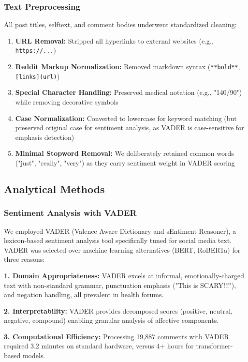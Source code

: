 \documentclass[12pt, a4paper]{article}
\begin{document}
\subsubsection{Text Preprocessing}
All post titles, selftext, and comment bodies underwent standardized cleaning:
\begin{enumerate}
    \item \textbf{URL Removal:} Stripped all hyperlinks to external websites (e.g., \texttt{https://...})
    \item \textbf{Reddit Markup Normalization:} Removed markdown syntax (\texttt{**bold**}, \texttt{[links](url)})
    \item \textbf{Special Character Handling:} Preserved medical notation (e.g., "140/90") while removing decorative symbols
    \item \textbf{Case Normalization:} Converted to lowercase for keyword matching (but preserved original case for sentiment analysis, as VADER is case-sensitive for emphasis detection)
    \item \textbf{Minimal Stopword Removal:} We deliberately retained common words ("just", "really", "very") as they carry sentiment weight in VADER scoring
\end{enumerate}

\subsection{Analytical Methods}

\subsubsection{Sentiment Analysis with VADER}
We employed VADER (Valence Aware Dictionary and sEntiment Reasoner), a lexicon-based sentiment analysis tool specifically tuned for social media text. VADER was selected over machine learning alternatives (BERT, RoBERTa) for three reasons:

\textbf{1. Domain Appropriateness:} VADER excels at informal, emotionally-charged text with non-standard grammar, punctuation emphasis ("This is SCARY!!!"), and negation handling, all prevalent in health forums.

\textbf{2. Interpretability:} VADER provides decomposed scores (positive, neutral, negative, compound) enabling granular analysis of affective components.

\textbf{3. Computational Efficiency:} Processing 19,887 comments with VADER required 3.2 minutes on standard hardware, versus 4+ hours for transformer-based models.
\end{document}
